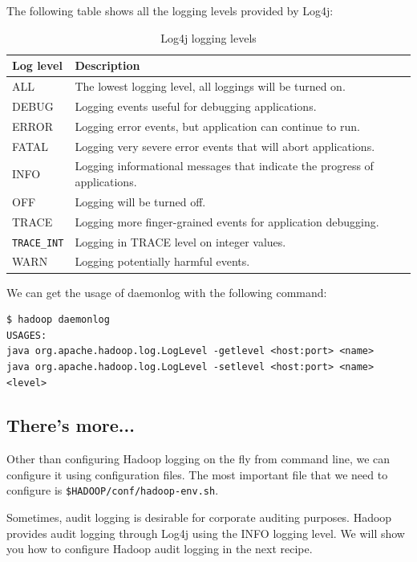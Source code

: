The following table shows all the logging levels provided by Log4j:
\begin{table}
  \begin{tabular}{ll}
    \toprule 
    \textbf{Log level} & \textbf{Description} \\ \midrule
    ALL & The lowest logging level, all loggings will be turned on. \\
    DEBUG & Logging events useful for debugging applications.\\
    ERROR & Logging error events, but application can continue to run. \\
    FATAL & Logging very severe error events that will abort applications. \\
    INFO & Logging informational messages that indicate the progress of applications. \\
    OFF & Logging will be turned off. \\
    TRACE & Logging more finger-grained events for application debugging. \\
    \verb|TRACE_INT| & Logging in TRACE level on integer values. \\
    WARN & Logging potentially harmful events. \\ \bottomrule
  \end{tabular}
  \caption{Log4j logging levels}\label{tbl:log4j}
\end{table}

We can get the usage of daemonlog with the following command:
\lstset{style=bashstyle}
\begin{lstlisting}
$ hadoop daemonlog
USAGES:
java org.apache.hadoop.log.LogLevel -getlevel <host:port> <name>
java org.apache.hadoop.log.LogLevel -setlevel <host:port> <name> <level>
\end{lstlisting}

\subsection*{There's more...}
Other than configuring Hadoop logging on the fly from command line, we can configure it using configuration files. The most important file that we need to configure is \verb|$HADOOP/conf/hadoop-env.sh|.

Sometimes, audit logging is desirable for corporate auditing purposes. Hadoop provides audit logging through Log4j using the INFO logging level. We will show you how to configure Hadoop audit logging in the next recipe.

